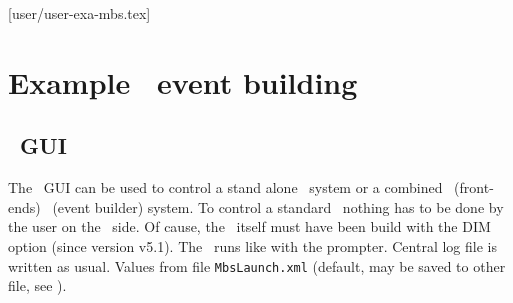 [user/user-exa-mbs.tex]
\section{Example \mbs\ event building}
\subsection{\mbs\ GUI}
The \dabc\ GUI can be used to control a stand alone \mbs\ system
or a combined \mbs\ (front-ends) \dabc\ (event builder) system.
To control a standard \mbs\ nothing has to be done by the user on the \mbs\ side.
Of cause, the \mbs\ itself must have been build with the DIM option (since version v5.1).
The \mbs\ runs like with the prompter. Central log file is written as usual.
Values from file {\tt MbsLaunch.xml} (default, may be saved to other file,
see ).
